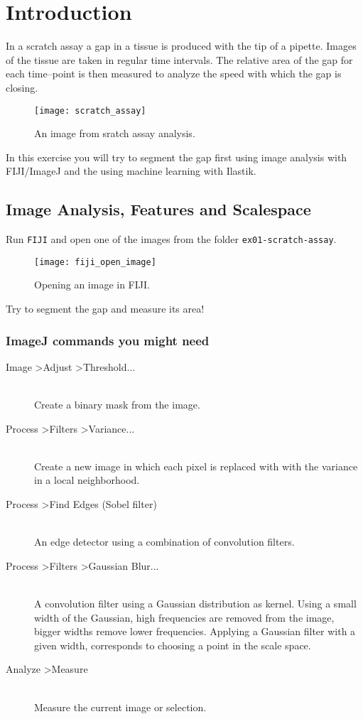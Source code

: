 \chapter{Introduction}

In a scratch assay a gap in a tissue is produced with the tip of a pipette. Images of the tissue are taken in regular time intervals. The relative area of the gap for each time--point is then measured to analyze the speed with which the gap is closing.  

\begin{figure}[!htb]
 \centering
 \texttt{[image: scratch\_assay]}
 \caption{An image from sratch assay analysis.}
 \label{figure:scratch-assay}
\end{figure}

In this exercise you will try to segment the gap first using image analysis with FIJI/ImageJ and the using machine learning with Ilastik.

\section{Image Analysis, Features and Scalespace}

Run {\tt FIJI} and open one of the images from the folder {\tt ex01-scratch-assay}.

\begin{figure}[!htb]
 \centering
 \texttt{[image: fiji\_open\_image]}
 \caption{Opening an image in FIJI.}
 \label{figure:fiji-open-image}
\end{figure}

Try to segment the gap and measure its area!

\subsection{ImageJ commands you might need}

\begin{description}
 \item[Image \textgreater Adjust \textgreater Threshold...] \hfill \\ 
 Create a binary mask from the image.
 \item[Process \textgreater Filters \textgreater Variance...] \hfill \\ Create a new image in which each pixel is replaced with with the variance in a local neighborhood.
 \item[Process \textgreater Find Edges (Sobel filter)] \hfill \\ An edge detector using a combination of convolution filters.
 \item[Process \textgreater Filters \textgreater Gaussian Blur...] \hfill \\ A convolution filter using a Gaussian distribution as kernel. Using a small width of the Gaussian, high frequencies are removed from the image, bigger widths remove lower frequencies. Applying a Gaussian filter with a given width, corresponds to choosing a point in the scale space.
\item[Analyze \textgreater Measure] \hfill \\
Measure the current image or selection. 
\end{description}

